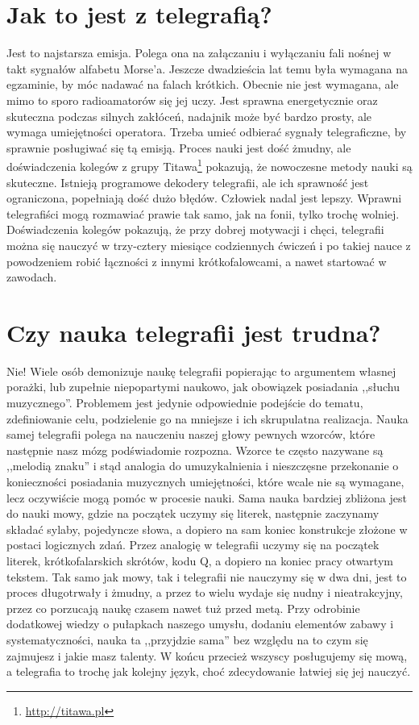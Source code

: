 \documentclass[a4paper,12pt]{article}
\begin{document}
\section{Jak to jest z telegrafią?}
Jest to najstarsza emisja. Polega ona na załączaniu i wyłączaniu fali nośnej w takt sygnałów alfabetu Morse'a. Jeszcze dwadzieścia lat temu była wymagana na egzaminie, by móc nadawać na falach krótkich. Obecnie nie jest wymagana, ale mimo to sporo radioamatorów się jej uczy. Jest sprawna energetycznie oraz skuteczna podczas silnych zakłóceń, nadajnik może być bardzo prosty, ale wymaga umiejętności operatora. Trzeba umieć odbierać sygnały telegraficzne, by sprawnie posługiwać się tą emisją. Proces nauki jest dość żmudny, ale doświadczenia kolegów z grupy Titawa\footnote{\url{http://titawa.pl}} pokazują, że nowoczesne metody nauki są skuteczne. Istnieją programowe dekodery telegrafii, ale ich sprawność jest ograniczona, popełniają dość dużo błędów. Człowiek nadal jest lepszy. Wprawni telegrafiści mogą rozmawiać prawie tak samo, jak na fonii, tylko trochę wolniej. Doświadczenia kolegów pokazują, że przy dobrej motywacji i chęci, telegrafii można się nauczyć w trzy-cztery miesiące codziennych ćwiczeń i po takiej nauce z powodzeniem robić łączności z innymi krótkofalowcami, a nawet startować w zawodach.

\section{Czy nauka telegrafii jest trudna?}
Nie! Wiele osób demonizuje naukę telegrafii popierając to argumentem własnej porażki, lub zupełnie niepopartymi naukowo, jak obowiązek posiadania ,,słuchu muzycznego''. Problemem jest jedynie odpowiednie podejście do tematu, zdefiniowanie celu, podzielenie go na mniejsze i ich skrupulatna realizacja. Nauka samej telegrafii polega na nauczeniu naszej głowy pewnych wzorców, które następnie nasz mózg podświadomie rozpozna. Wzorce te często nazywane są ,,melodią znaku'' i stąd analogia do umuzykalnienia i nieszczęsne przekonanie o konieczności posiadania muzycznych umiejętności, które wcale nie są wymagane, lecz oczywiście mogą pomóc w procesie nauki. Sama nauka bardziej zbliżona jest do nauki mowy, gdzie na początek uczymy się literek, następnie zaczynamy składać sylaby, pojedyncze słowa, a dopiero na sam koniec konstrukcje złożone w postaci logicznych zdań. Przez analogię w telegrafii uczymy się na początek literek, krótkofalarskich skrótów, kodu Q, a dopiero na koniec pracy otwartym tekstem. Tak samo jak mowy, tak i telegrafii nie nauczymy się w dwa dni, jest to proces długotrwały i żmudny, a przez to wielu wydaje się nudny i nieatrakcyjny, przez co porzucają naukę czasem nawet tuż przed metą. Przy odrobinie dodatkowej wiedzy o pułapkach naszego umysłu, dodaniu elementów zabawy i systematyczności, nauka ta ,,przyjdzie sama'' bez względu na to czym się zajmujesz i jakie masz talenty. W końcu przecież wszyscy posługujemy się mową, a telegrafia to trochę jak kolejny język, choć zdecydowanie łatwiej się jej nauczyć. 
\end{document}

